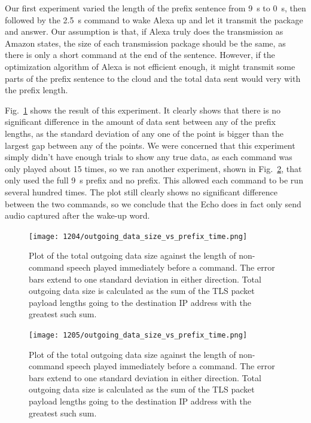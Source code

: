 Our first experiment varied the length of the prefix sentence from 9~s to 0~s, then followed by the 2.5~s command to wake Alexa up and let it transmit the package and answer. Our assumption is that, if Alexa truly does the transmission as Amazon states, the size of each transmission package should be the same, as there is only a short command at the end of the sentence. However, if the optimization algorithm of Alexa is not efficient enough, it might transmit some parts of the prefix sentence to the cloud and the total data sent would very with the prefix length. 

Fig.~\ref{fig:prefix_many} shows the result of this experiment. It clearly shows that there is no significant difference in the amount of data sent between any of the prefix lengths, as the standard deviation of any one of the point is bigger than the largest gap between any of the points. We were concerned that this experiment simply didn't have enough trials to show any true data, as each command was only played about 15 times, so we ran another experiment, shown in Fig.~\ref{fig:prefix_two}, that only used the full 9~s prefix and no prefix. This allowed each command to be run several hundred times. The plot still clearly shows no significant difference between the two commands, so we conclude that the Echo does in fact only send audio captured after the wake-up word.
 
\begin{figure}[]
    \centering
    \texttt{[image: 1204/outgoing\_data\_size\_vs\_prefix\_time.png]}
    \caption{Plot of the total outgoing data size against the length of non-command speech played immediately before a command. The error bars extend to one standard deviation in either direction. Total outgoing data size is calculated as the sum of the TLS packet payload lengths going to the destination IP address with the greatest such sum.}
    \label{fig:prefix_many}
\end{figure}

\begin{figure}[]
    \centering
    \texttt{[image: 1205/outgoing\_data\_size\_vs\_prefix\_time.png]}
    \caption{Plot of the total outgoing data size against the length of non-command speech played immediately before a command. The error bars extend to one standard deviation in either direction. Total outgoing data size is calculated as the sum of the TLS packet payload lengths going to the destination IP address with the greatest such sum.}
    \label{fig:prefix_two}
\end{figure}




